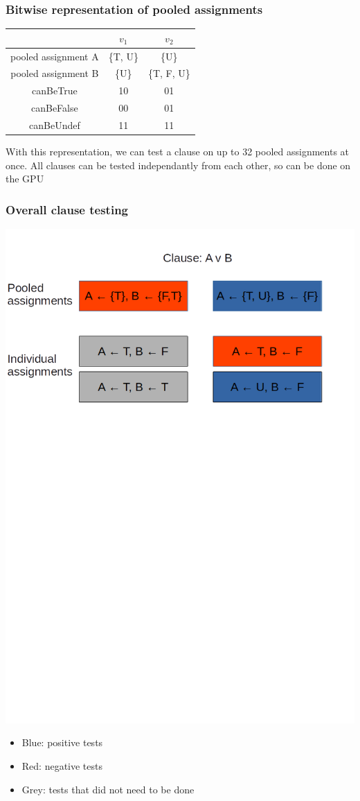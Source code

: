 \documentclass{beamer}
\begin{document}
\begin{frame}
\frametitle{Bitwise representation of pooled assignments}
\begin{center}
\begin{tabular}{ | c | c | c |}
\hline
 & $v_1$ & $v_2$ \\ 
\hline
pooled assignment A & \{T, U\} & \{U\} \\  
pooled assignment B & \{U\} & \{T, F, U\} \\    
\hline
canBeTrue & 10 & 01 \\
canBeFalse & 00 & 01 \\
canBeUndef & 11 & 11 \\
\hline
\end{tabular}
\end{center}

With this representation, we can test a clause on up to 32 pooled assignments at once.
All clauses can be tested independantly from each other, so can be done on the GPU

\end{frame}

\begin{frame}
\frametitle{Overall clause testing}
\includegraphics[width=\textwidth]{clauseTest.png}
\begin{itemize}
\item Blue: positive tests
\item Red: negative tests
\item Grey: tests that did not need to be done
\end{itemize}
\end{frame}
\end{document}
